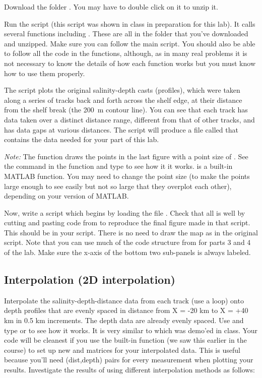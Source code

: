 \documentclass[letterpaper]{article}
\begin{document}
Download the  folder .  You may have to double click on it to unzip it. 

Run the script  (this script was shown in class in preparation for this lab).  It calls several functions including .  These are all in the folder that you've downloaded and unzipped.  Make sure you can follow the main script.  You should also be able to follow all the code in the functions, although, as in many real problems it is not necessary to know the  details of how each function works but you must know how to use them properly.

The script plots the original salinity-depth casts (profiles), which were taken along a series of tracks back and forth across
the shelf edge,  at their distance from the shelf break (the 200~m contour line).  You can see that each track has data taken over a distinct distance range, different from that of other tracks, and has data gaps at various distances.   The script will produce a file called  that contains the data needed for your part of this lab.

{\it Note:} The function  draws the points in the last figure with a point size of .  See the  command in the function and type  to see how it it works.   is a built-in MATLAB function.  You may need to change the point size (to make the points large enough to see easily but not so large that they overplot each other), depending on your version of MATLAB.

Now, write a script  which begins by loading the file .  Check that all is well by cutting and pasting code from  to reproduce the final figure made in that script.   This should be  in your  script.    There is no need to draw the map as in the original script. 
Note that you can use much of the code structure from  for parts 3 and 4 of the lab. 
Make sure the x-axis of the bottom two sub-panels is always labeled.  

\subsection {Interpolation (2D interpolation)}

Interpolate the salinity-depth-distance data from each track (use a loop) onto depth profiles that are evenly spaced in distance from X = -20 km to X = +40 km in 0.5 km increments.  The depth data are already evenly spaced.  
Use  and type  or  to see how it works.  It is very similar to  which was demo'ed in class.  Your code will be cleanest if you use the built-in function  (we saw this earlier in the course) to set up new  and  matrices for your interpolated data.
This is useful because you'll need (dist,depth) pairs for every measurement when plotting your results.  Investigate the results of using different interpolation methods as follows:
\end{document}
